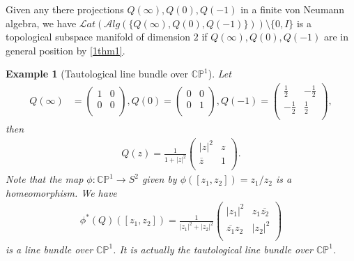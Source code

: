 \documentclass[a4paper,10pt]{amsart}
\newtheorem{example}{Example}[section]
\newcommand{\Lat}{\mathcal Lat}
\newcommand{\Alg}{\mathcal Alg}
\newcommand{\C}{\mathbb C} %
\begin{document}
Given any there projections $Q(\infty), Q(0), Q(-1)$ in a 
finite von Neumann
algebra, we have $\Lat(\Alg(\{Q(\infty), Q(0), Q(-1)\})) \setminus \{0, I\}$
is a topological subspace manifold of dimension $2$ 
if $Q(\infty), Q(0), Q(-1)$
are in general position by \cref{1thm1}.

\begin{example}[Tautological line bundle over $\C\mathbb{P}^1$]
Let
\begin{align*}
Q(\infty)&= \left(
        \begin{array}{cc}
          1 & 0 \\
          0 & 0 \\
        \end{array}
      \right),
Q(0)= \left(
        \begin{array}{cc}
          0 & 0 \\
          0 & 1 \\
        \end{array}
      \right),
Q(-1)= \left(
        \begin{array}{cc}
          \frac{1}{2} & -\frac{1}{2} \\
          -\frac{1}{2} & \frac{1}{2} \\
        \end{array}
      \right),
\end{align*}
then 
\begin{align*}
Q(z) = \frac{1}{1+|z|^2}
    \left(
        \begin{array}{cc}
          |z|^2 & z \\
        \overline{z} & 1\\
        \end{array}
      \right).  
\end{align*}
Note that the map $\phi: \C\mathbb{P}^1 \rightarrow S^{2}$ given by
$\phi([z_1, z_2]) = z_1/z_2$ is a homeomorphism. We have
\begin{align*}
\phi^{*}(Q)([z_1, z_2]) = \frac{1}{|z_1|^2+|z_2|^2}
    \left(
        \begin{array}{cc}
            |z_1|^2 & z_1 \overline{z_2} \\
        \overline{z_1}z_2 & |z_2|^2\\
        \end{array}
      \right) 
\end{align*}
is a line bundle over $\C\mathbb{P}^{1}$. 
It is actually the tautological line  bundle over $\C\mathbb{P}^1$.
\end{example}
\end{document}
